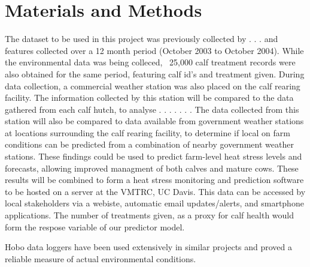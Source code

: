 \documentclass[12pt]{article}
\begin{document}
	\newpage
	\section{Materials and Methods}
		The dataset to be used in this project was previously collected by . . .  %
		and features collected over a 12 month period (October 2003 to October 2004). While the environmental data was being colleced, ~25,000 calf treatment records were also obtained for the same period, featuring calf id's and treatment given. 
		During data collection, a commercial weather station was also placed on the calf rearing facility. The information collected by this station will be compared to the data gathered from each calf hutch, to analyse . . . . . . . The data collected from this station will also be compared to data available from government weather stations at locations surrounding the calf rearing facility, to determine if local on farm conditions can be predicted from a combination of nearby government weather stations. These findings could be used to predict farm-level heat stress levels and forecasts, allowing improved managment of both calves and mature cows.
		These results will be combined to form a heat stress monitoring and prediction software to be hosted on a server at the VMTRC, UC Davis. This data can be accessed by local stakeholders via a webiste, automatic email updates/alerts, and smartphone applications.
		The number of treatments given, as a proxy for calf health would form the respose variable of our predictor model.

		Hobo data loggers have been used extensively in similar projects and proved a reliable measure of actual environmental conditions\cite{Scharf2011,Jousan2007}.
	\newpage
	
	
\end{document}
